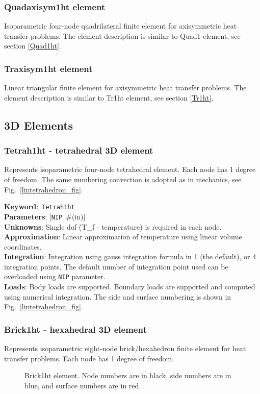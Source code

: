 \documentclass[a4paper]{article}
\newcommand{\descitem}[1]{{\noindent \textbf{#1}}:}
\newcommand{\elemkeyword}[1]{\descitem{Keyword}~\param{#1}} %
\newcommand{\param}[1]{\texttt{#1}} %
\newcommand{\optional}[1]{[#1]} %
\newcommand{\field}[2]{\param{#1}~\#{\tiny(#2)}} %
\newcommand{\optField}[2]{\optional{\field{#1}{#2}}}
\begin{document}
\subsubsection{Quadaxisym1ht element}
Isoparametric four-node quadrilateral finite element for
axisymmetric heat transfer problems. The element description is
similar to Quad1 element, see section \ref{Quad1ht}.


\subsubsection{Traxisym1ht element}
Linear triangular finite element for axisymmetric heat transfer
problems. The element description is
similar to Tr1ht element, see section \ref{Tr1ht}.

\clearpage
\subsection{3D Elements}
\subsubsection{Tetrah1ht - tetrahedral 3D element}
Represents isoparametric four-node tetrahedral element. Each node has 1 degree of freedom.
The same numbering convection is adopted as in mechanics, see Fig.~\ref{lintetrahedron_fig}.

\elemkeyword{Tetrah1ht}\\
\descitem{Parameters} \optField{NIP}{in}\\
\descitem{Unknowns} Single dof (T\_f - temperature) is required in each node.\\
\descitem{Approximation} Linear approximation of temperature using linear volume coordinates.\\
\descitem{Integration}
Integration using gauss integration formula
in 1 (the default), or 4 integration points. The default number of
integration point used can be overloaded using \param{NIP} parameter.\\
\descitem{Loads} Body loads are supported. Boundary loads are
supported and computed using numerical integration. The side and
surface numbering is shown in Fig.~\ref{lintetrahedron_fig}.


\subsubsection{Brick1ht - hexahedral 3D element}
\label{Brick1ht}
Represents isoparametric eight-node brick/hexahedron finite element for
heat transfer problems. Each node has 1 degree of freedom.
\begin{figure}[htb]
 \centering
 \begin{makeimage}
  
 \end{makeimage}
 \caption{Brick1ht element. Node numbers are in black, side numbers are in blue,
 and surface numbers are in red.}
 \label{Brick1htfig}
\end{figure}
\end{document}
